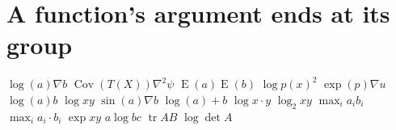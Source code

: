 \documentclass{article}
\begin{document}
\section{A function's argument ends at its group}
$\log(a)\nabla b$ $\operatorname{Cov}(T(X))\nabla^{2}\psi$ $\operatorname{E}(a)\operatorname{E}(b)$ $\log p(x)^{2}$
$\exp(p)\nabla u$ $\log(a)b$ $\log x y$ $\sin(a)\nabla b$ $\log(a)+b$
$\log x\cdot y$ $\log_2 x y$ $\max_i a_i b_i$ $\max_i a_i\cdot b_i$ $\exp x y$ $a\log b c$ $\operatorname{tr} AB$ $\log\det A$
\end{document}
